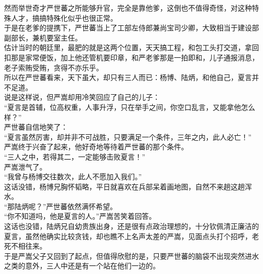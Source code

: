 \begin{multicols}{\theparacolNo}
然而举世奇才严世蕃之所能够升官，完全是靠他爹，这倒也不值得奇怪，对这种特殊人才，搞搞特殊化似乎也很正常。\\

于是在老爹的提携下，严世蕃当上了工部左侍郎兼尚宝司少卿，大致相当于建设部副部长，兼机要室主任。\\

估计当时的朝廷里，最肥的就是这两个位置，天天搞工程，和包工头打交道，拿回扣那是家常便饭，加上他还管机要印章，和严老爹那是一拍即和，儿子通报消息，老子索贿受贿，贪得不亦乐乎。\\

所以在严世蕃看来，天下虽大，却只有三人而已：杨博、陆炳，和他自己，夏言并不足道。\\

说是这样说，但严嵩却用冷笑回应了自己的儿子：\\

“夏言是首辅，位高权重，人事升浮，只在举手之间，你空口乱言，又能拿他怎么样？”\\

严世蕃自信地笑了：\\

“夏言虽然厉害，却并非不可战胜，只要满足一个条件，三年之内，此人必亡！”\\

严嵩终于兴奋了起来，他好奇地等待着严世蕃的那个条件。\\

“三人之中，若得其二，一定能够击败夏言！”\\

严嵩泄气了。\\

“我曾与杨博交往数次，此人不愿加入我们。”\\

这话没错，杨博兄胸怀韬略，平日就喜欢在兵部呆着画地图，自然不来趟这趟浑水。\\

“那陆炳呢？”严世蕃依然满怀希望。\\

“你不知道吗，他是夏言的人。”严嵩苦笑着回答。\\

这话也没错，陆炳兄自幼贵族出身，还是很有点政治理想的，十分钦佩清正廉洁的夏言，虽然他确实比较贪钱，却也瞧不上名声太差的严嵩，见面点头打个招呼，老死不相往来。\\

于是严嵩父子又回到了起点，但值得欣慰的是，只要严世蕃的脑袋不出现突然进水之类的意外，三人中还是有一个站在他们一边的。\\
\ifnum{}
	\end{multicols}
\fi
\newpage
